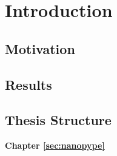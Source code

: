 \chapter{Introduction}
\label{sec:intro}



\section{Motivation}
\label{sec:intro:motivation}

\section{Results}
\label{sec:intro:results}


\section{Thesis Structure}
\label{sec:intro:structure}


\textbf{Chapter \ref{sec:nanopype}} \\[0.2em]
\blindtext

